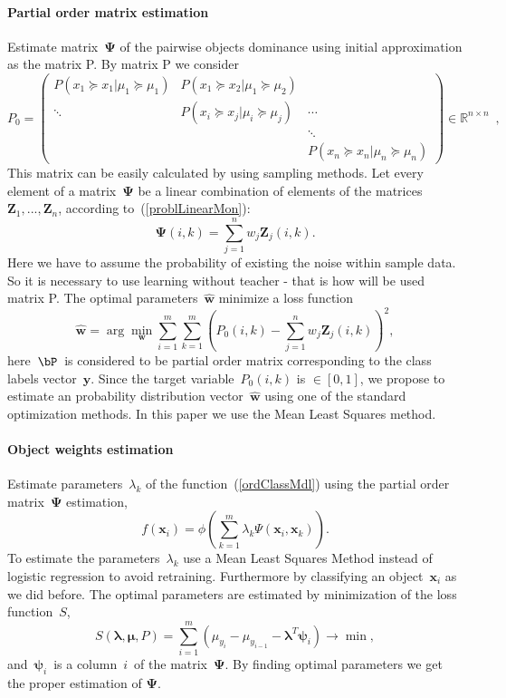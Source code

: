 \documentclass[12pt,preprint]{elsarticle}
\newcommand{\blambda}{\boldsymbol{\lambda}}
\newcommand{\bx}{\mathbf{x}}
\newcommand{\by}{\mathbf{y}}
\newcommand{\bw}{\mathbf{w}}
\newcommand{\bZ}{\mathbf{Z}}
\newcommand{\bPsi}{\boldsymbol{\Psi}}
\newcommand{\bpsi}{\boldsymbol{\psi}}
\begin{document}
\paragraph{Partial order matrix estimation}
Estimate matrix~$\bPsi$ of the pairwise objects dominance using initial approximation as the matrix P. By matrix P we consider
$$P_0 = \begin{pmatrix} P(x_1 \succeq x_1 | \mu_1 \succeq \mu_1) & P(x_1 \succeq x_2 | \mu_1 \succeq \mu_2) &                   \\
 \ddots   & P(x_i \succeq x_j | \mu_i \succeq \mu_j) & \cdots                                  \\
  &    & \ddots     \\
  &    &                    P(x_n \succeq x_n | \mu_n \succeq \mu_n)\end{pmatrix}
 \in \mathbb{R}^{n \times n}\enspace,
$$
This matrix can be easily calculated by using sampling methods.
Let every element of a matrix~$\bPsi$ be a linear combination of elements of the matrices~$\bZ_1,...,\bZ_n$, according to~(\ref{problLinearMon}):
\[
\bPsi(i,k)=\sum\limits_{j=1}^n w_j\bZ_j(i,k).
\]
Here we have to assume the probability of existing the noise within sample data. So it is necessary to use learning without teacher - that is how will be used matrix P.
The optimal parameters~$\hat{\bw}$ minimize a loss function
\[
\hat{\bw} = \arg\min\limits_{\bw}\sum\limits_{i=1}^m\sum\limits_{k=1}^m\left(P_0(i,k) - \sum\limits_{j=1}^n w_j\bZ_j(i,k)\right)^2,
\]
here~$\bP$~is considered to be partial order matrix corresponding to the class labels vector~$\by$.
Since the target variable~$P_0(i,k)$ is $\in[0,1]$, we propose to estimate an probability distribution vector~$\hat{\bw}$ using one of the standard optimization methods. In this paper we use the Mean Least Squares method.



\paragraph{Object weights estimation}
Estimate parameters~$\lambda_k$ of the function~(\ref{ordClassMdl}) using the partial order matrix~$\bPsi$ estimation,
\[
f(\bx_i) = \phi\left(\sum\limits_{k=1}^m \lambda_{k} \Psi(\bx_i, \bx_k)\right).
\]
To estimate the parameters~$\lambda_k$ use a Mean Least Squares Method instead of logistic regression to avoid retraining. Furthermore by classifying an object~$\bx_i$ as we did before. The optimal parameters are estimated by minimization of the loss function~$S$,
\[
S(\blambda, \boldsymbol{\mu}, P)=\sum\limits_{i=1}^m \left(\mu_{y_i}- \mu_{y_{i-1}} - \blambda^T \bpsi_i\right)\rightarrow \min,
\]
and~$\bpsi_i$~is a column~$i$~of the matrix~$\bPsi$.
By finding optimal parameters we get the proper estimation of $\bPsi$.
\end{document}
